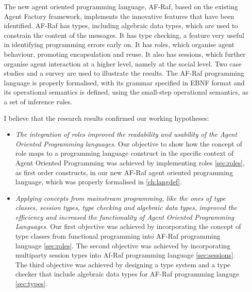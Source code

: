 \documentclass[a4paper,12pt,oneside,fleqn]{book} %
\begin{document}
The new agent oriented programming language, AF-Raf, based on the existing
Agent Factory framework, implements the innovative features that have been
identified. AF-Raf has types, including algebraic data types, which are
used to constrain the content of the messages. It has type checking, a
feature very useful in identifying programming errors early on. It has
roles, which organise agent behaviour, promoting encapsulation and reuse.
It also has sessions, which further organise agent interaction at a higher
level, namely at the social level. Two case studies and a survey are used
to illustrate the results. The AF-Raf programming language is properly
formalised, with its grammar specified in EBNF format and its operational
semantics is defined, using the small-step operational semantics, as a set
of inference rules.

I believe that the research results confirmed our working hypotheses:

\begin{itemize}
\item \textit{The integration of roles improved the readability and
usability of the Agent Oriented Programming languages}. Our objective to
show how the concept of role maps to a programming language construct in
the specific context of Agent Oriented Programming was achieved by
implementing roles \autoref{sec:roles}, as first order constructs, in our new AF-Raf
agent oriented programming language, which was properly formalised in
\autoref{ch:langdef}.

\item \textit{Applying concepts from mainstream programming, like the ones
  of type classes, session types, type checking and algebraic data types,
improved the efficiency and increased the functionality of Agent Oriented
Programming Languages}. Our first objective was achieved by incorporating
the concept of type classes from functional programming into AF-Raf
programming language \autoref{sec:roles}. The second objective was achieved
by incorporating multiparty session types into Af-Raf programming language
\autoref{sec:sessions}. The third objective was achieved by designing a
type system and a type checker that include algebraic data types for AF-Raf
programming languge \autoref{sec:types}.

\end{itemize}
\newpage
\appendix
\end{document}
